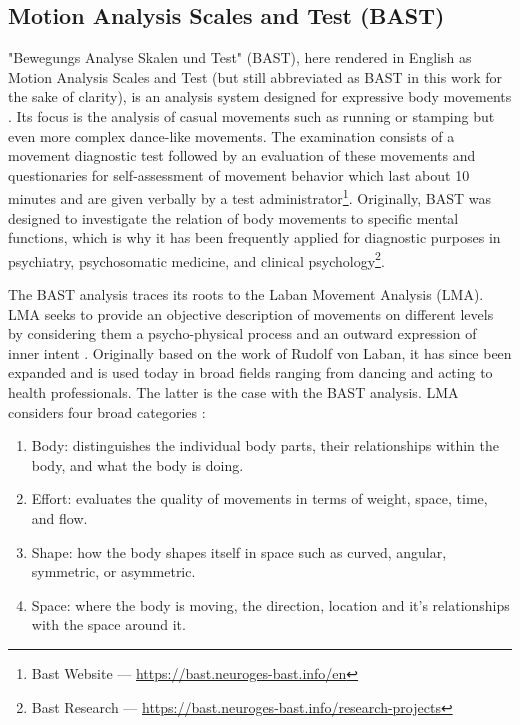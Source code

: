 \documentclass[extern,palatino]{cgMA}
\begin{document}
\subsection{Motion Analysis Scales and Test (BAST)}
\label{intro_bast_laban}

"Bewegungs Analyse Skalen und Test" (BAST), here rendered in English as Motion Analysis Scales and Test (but still abbreviated as BAST in this work for the sake of clarity), is an analysis system designed for expressive body movements \cite{lausberg1997bewegungsdiagnosetest}. Its focus is the analysis of casual movements such as running or stamping but even more complex dance-like movements. The examination consists of a movement diagnostic test followed by an evaluation of these movements and questionaries for self-assessment of movement behavior which last about 10 minutes and are given verbally by a test administrator\footnote{Bast Website --- \url{https://bast.neuroges-bast.info/en}}. Originally, BAST was designed to investigate the relation of body movements to specific mental functions, which is why it has been frequently applied for diagnostic purposes in psychiatry, psychosomatic medicine, and clinical psychology\footnote{Bast Research --- \url{https://bast.neuroges-bast.info/research-projects}}.

The BAST analysis traces its roots to the Laban Movement Analysis (LMA). LMA seeks to provide an objective description of movements on different levels by considering them a psycho-physical process and an outward expression of inner intent \cite{groff1995laban}. Originally based on the work of Rudolf von Laban, it has since been expanded and is used today in broad fields ranging from dancing and acting to health professionals. The latter is the case with the BAST analysis. LMA considers four broad categories \cite{groff1995laban}:

\begin{enumerate}
\item Body: distinguishes the individual body parts, their relationships within the body, and what the body is doing.
\item Effort: evaluates the quality of movements in terms of weight, space, time, and flow.
\item Shape: how the body shapes itself in space such as curved, angular, symmetric, or asymmetric.
\item Space: where the body is moving, the direction, location and it’s relationships with the space around it.
\end{enumerate}
\end{document}
